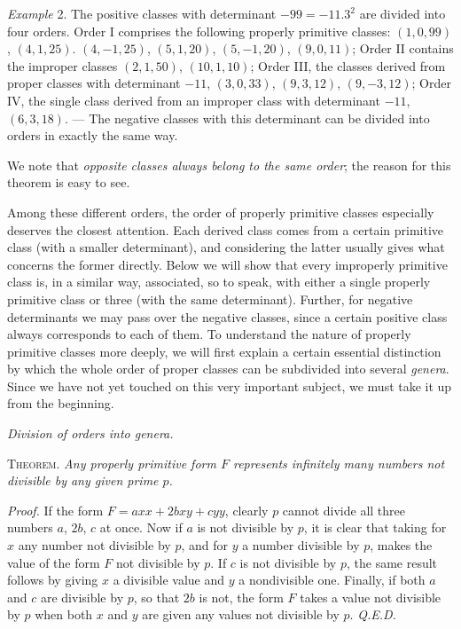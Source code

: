 \textit{Example} 2. The positive classes with determinant $-99=-11.3^2$ are divided into four orders. Order I comprises the following properly primitive classes: $(1,0,99)$, $(4,1,25)$. $(4,-1,25)$, $(5,1,20)$, $(5,-1,20)$, $(9,0,11)$; Order II contains the improper classes $(2,1,50)$, $(10,1,10)$; Order III, the classes derived from proper classes with determinant $-11$, $(3,0,33)$, $(9,3,12)$, $(9,-3,12)$; Order IV, the single class derived from an improper class with determinant $-11$, $(6,3,18)$. --- The negative classes with this determinant can be divided into orders in exactly the same way.

We note that \textit{opposite classes always belong to the same order}; the reason for this theorem is easy to see.

Among these different orders, the order of properly primitive classes especially deserves the closest attention. Each derived class comes from a certain primitive class (with a smaller determinant), and considering the latter usually gives what concerns the former directly. Below we will show that every improperly primitive class is, in a similar way, associated, so to speak, with either a single properly primitive class or three (with the same determinant). Further, for negative determinants we may pass over the negative classes, since a certain positive class always corresponds to each of them. To understand the nature of properly primitive classes more deeply, we will first explain a certain essential distinction by which the whole order of proper classes can be subdivided into several \textit{genera}. Since we have not yet touched on this very important subject, we must take it up from the beginning.

\begin{center}
\textit{Division of orders into genera.}
\end{center}

\textsc{Theorem.} \textit{Any properly primitive form $F$ represents infinitely many numbers not divisible by any given prime $p$.}

\textit{Proof.} If the form $F=axx+2bxy+cyy$, clearly $p$ cannot divide all three numbers $a$, $2b$, $c$ at once. Now if $a$ is not divisible by $p$, it is clear that taking for $x$ any number not divisible by $p$, and for $y$ a number divisible by $p$, makes the value of the form $F$ not divisible by $p$. If $c$ is not divisible by $p$, the same result follows by giving $x$ a divisible value and $y$ a nondivisible one. Finally, if both $a$ and $c$ are divisible by $p$, so that $2b$ is not, the form $F$ takes a value not divisible by $p$ when both $x$ and $y$ are given any values not divisible by $p$. \textit{Q.E.D.}

